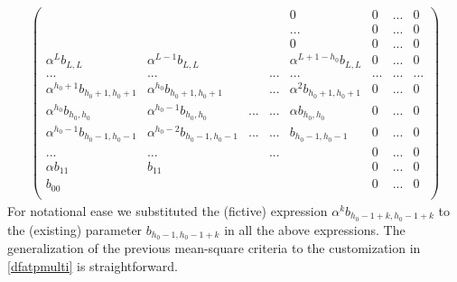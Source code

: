 \documentclass[11pt]{article}
\begin{document}
\begin{eqnarray}\label{par1}
\left(
  \begin{array}{cccccccc}
                                  &                               &                         &     & 0                           &0          &...&0   \\
                                  &                               &                         &     & ...                         &0          &...&0   \\
                                  &                               &                         &     & 0                           &0          &...&0   \\
     \alpha^{L}b_{L,L}            &\alpha^{L-1}b_{L,L}            &                         &     & \alpha^{L+1-h_0}b_{L,L}       &0          &...&0 \\
    ...                           & ...                           &                         &...  &  ...                        & ...       &...&...    \\
    \alpha^{h_0+1}b_{h_0+1,h_0+1} &\alpha^{h_0}b_{h_0+1,h_0+1}    &                         & ... & \alpha^2b_{h_0+1,h_0+1}     &0  &...&0   \\
      \alpha^{h_0}b_{h_0,h_0}     &\alpha^{h_0-1}b_{h_0,h_0}      &   ...                   & ... & \alpha b_{h_0,h_0}          &0  &...&0   \\
    \alpha^{h_0-1}b_{h_0-1,h_0-1} & \alpha^{h_0-2}b_{h_0-1,h_0-1} &         ...             & ... & b_{h_0-1,h_0-1}             &0  &...&0 \\
    ...                           &...                            &                         &...  &                             &0  &...&0 \\
    \alpha b_{11}                 & b_{11}                        &                         &     &                             &0  &...&0\\
    b_{00}                        &                               &                         &     &                             &0  &...&0\\
  \end{array}
\right)
\end{eqnarray}
For notational ease we substituted the (fictive) expression $\alpha^{k}b_{h_0-1+k,h_0-1+k}$ to the (existing) parameter $b_{h_0-1,h_0-1+k}$ in all the above expressions.
The generalization of the previous mean-square criteria to the customization in \ref{dfatpmulti} is straightforward.\\
\end{document}
